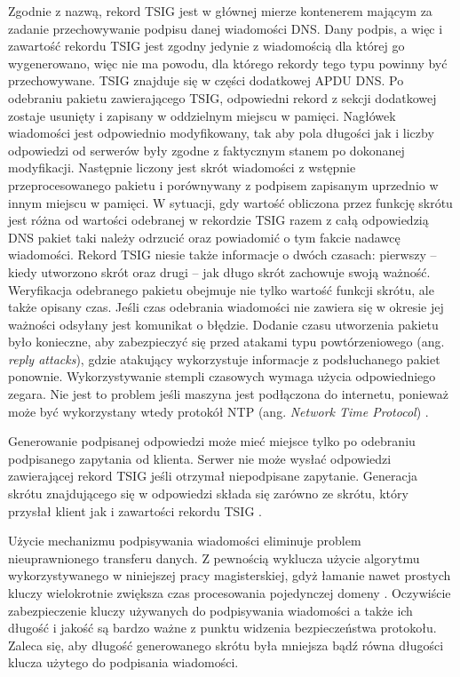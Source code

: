 Zgodnie z nazwą, rekord TSIG jest w głównej mierze kontenerem mającym za zadanie przechowywanie podpisu danej wiadomości DNS.
Dany podpis, a więc i zawartość rekordu TSIG jest zgodny jedynie z wiadomością dla której go wygenerowano, więc
nie ma powodu, dla którego rekordy tego typu powinny być przechowywane.
TSIG znajduje się w części dodatkowej APDU DNS. Po odebraniu pakietu zawierającego TSIG, odpowiedni rekord z sekcji dodatkowej zostaje
usunięty i zapisany w oddzielnym miejscu w pamięci. Nagłówek wiadomości jest odpowiednio modyfikowany, tak aby pola długości jak i
liczby odpowiedzi od serwerów były zgodne z faktycznym stanem po dokonanej modyfikacji. Następnie liczony jest skrót wiadomości z
wstępnie przeprocesowanego pakietu i porównywany z podpisem zapisanym uprzednio w innym miejscu w pamięci. W sytuacji, gdy wartość
obliczona przez funkcję skrótu jest różna od wartości odebranej w rekordzie TSIG razem z całą odpowiedzią DNS pakiet taki należy
odrzucić oraz powiadomić o tym fakcie nadawcę wiadomości. Rekord TSIG niesie także informacje o dwóch czasach: pierwszy -- kiedy
utworzono skrót oraz drugi -- jak długo skrót zachowuje swoją ważność. Weryfikacja odebranego pakietu obejmuje nie tylko wartość
funkcji skrótu, ale także opisany czas. Jeśli czas odebrania wiadomości nie zawiera się w okresie jej ważności odsyłany jest komunikat
o błędzie. Dodanie czasu utworzenia pakietu było konieczne, aby zabezpieczyć się przed atakami typu powtórzeniowego (ang. \textit{reply attacks}),
gdzie atakujący wykorzystuje informacje z podsłuchanego pakiet ponownie. Wykorzystywanie stempli czasowych wymaga użycia
odpowiedniego zegara. Nie jest to problem jeśli maszyna jest podłączona do internetu, ponieważ może
być wykorzystany wtedy protokół NTP (ang. \textit{Network Time Protocol}) \cite{RFC5905}.

Generowanie podpisanej odpowiedzi może mieć miejsce tylko po odebraniu podpisanego zapytania od klienta. Serwer nie może wysłać
odpowiedzi zawierającej rekord TSIG jeśli otrzymał niepodpisane zapytanie. Generacja skrótu znajdującego się w odpowiedzi składa
się zarówno ze skrótu, który przysłał klient jak i zawartości rekordu TSIG \cite{nask-tsig}.

Użycie mechanizmu podpisywania wiadomości eliminuje problem nieuprawnionego transferu danych. Z pewnością wyklucza
użycie algorytmu wykorzystywanego w niniejszej pracy magisterskiej, gdyż łamanie nawet prostych kluczy wielokrotnie zwiększa czas
procesowania pojedynczej domeny \cite{nask-tsig}. Oczywiście zabezpieczenie kluczy używanych do podpisywania wiadomości a także ich
długość i jakość są bardzo ważne z punktu widzenia bezpieczeństwa protokołu. Zaleca się, aby długość generowanego skrótu była mniejsza
bądź równa długości klucza użytego do podpisania wiadomości.

